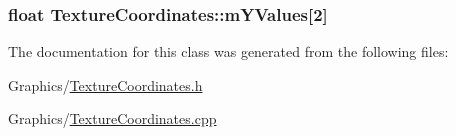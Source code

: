 \subsubsection[{\texorpdfstring{m\+Y\+Values}{mYValues}}]{\setlength{\rightskip}{0pt plus 5cm}float Texture\+Coordinates\+::m\+Y\+Values\mbox{[}2\mbox{]}\hspace{0.3cm}{\ttfamily [private]}}\hypertarget{classTextureCoordinates_a1857ab9e774582ad6a361070d26e89d9}{}\label{classTextureCoordinates_a1857ab9e774582ad6a361070d26e89d9}


The documentation for this class was generated from the following files\+:\begin{DoxyCompactItemize}
\item 
Graphics/\hyperlink{TextureCoordinates_8h}{Texture\+Coordinates.\+h}\item 
Graphics/\hyperlink{TextureCoordinates_8cpp}{Texture\+Coordinates.\+cpp}\end{DoxyCompactItemize}
